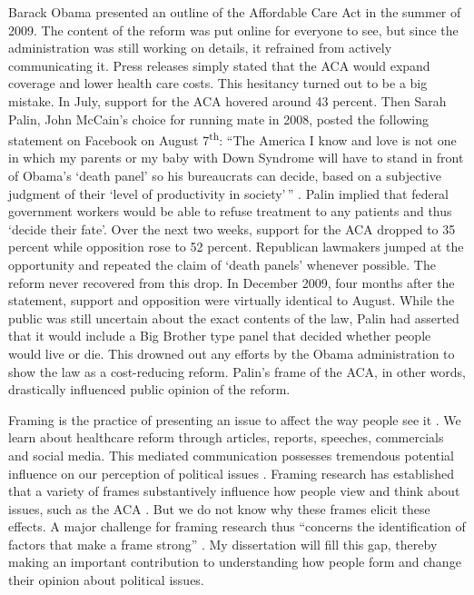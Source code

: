 \documentclass[11pt]{article}
\begin{document}
Barack Obama presented an outline of the Affordable Care Act in the summer of 2009. The content of the reform was put online for everyone to see, but since the administration was still working on details, it refrained from actively communicating it. Press releases simply stated that the ACA would expand coverage and lower health care costs. This hesitancy turned out to be a big mistake. In July, support for the ACA hovered around 43 percent. Then Sarah Palin, John McCain's choice for running mate in 2008, posted the following statement on Facebook on August 7\textsuperscript{th}: ``The America I know and love is not one in which my parents or my baby with Down Syndrome will have to stand in front of Obama's `death panel' so his bureaucrats can decide, based on a subjective judgment of their `level of productivity in society'\,'' \citep{palin_statement_2009}. Palin implied that federal government workers would be able to refuse treatment to any patients and thus `decide their fate'. Over the next two weeks, support for the ACA dropped to 35 percent while opposition rose to 52 percent. Republican lawmakers jumped at the opportunity and repeated the claim of `death panels' whenever possible. The reform never recovered from this drop. In December 2009, four months after the statement, support and opposition were virtually identical to August. While the public was still uncertain about the exact contents of the law, Palin had asserted that it would include a Big Brother type panel that decided whether people would live or die. This drowned out any efforts by the Obama administration to show the law as a cost-reducing reform. Palin's frame of the ACA, in other words, drastically influenced public opinion of the reform.

Framing is the practice of presenting an issue to affect the way people see it \citep{aaroe_investigating_2011, druckman_evaluating_2001,tversky_framing_1981}. We learn about healthcare reform through articles, reports, speeches, commercials and social media. This mediated communication possesses tremendous potential influence on our perception of political issues \citep{iyengar_framing_1996, gross_framing_2008,kam_risk_2010}. Framing research has established that a variety of frames substantively influence how people view and think about issues, such as the ACA \citep{ price_switching_1997,andsager_how_2000, callaghan_introduction:_2005, entman_framing:_1993, entman_projections_2004, gamson_media_1989, vreese_effects_2004, pan_framing_1993, slothuus_political_2010, sniderman_structure_2004}. But we do not know why these frames elicit these effects. A major challenge for framing research thus ``concerns the identification of factors that make a frame strong'' \citep[p.~116]{chong_framing_2007}. My dissertation will fill this gap, thereby making an important contribution to understanding how people form and change their opinion about political issues. 
\end{document}
